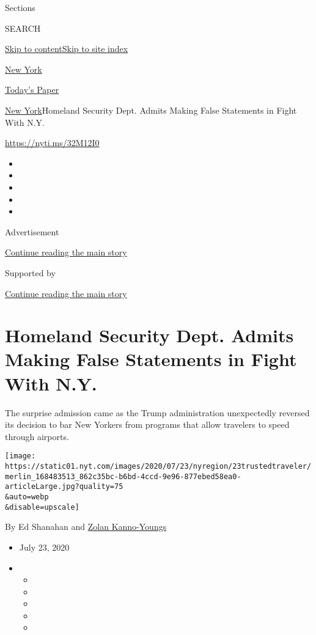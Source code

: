 Sections

SEARCH

\protect\hyperlink{site-content}{Skip to
content}\protect\hyperlink{site-index}{Skip to site index}

\href{https://www.nytimes.com/section/nyregion}{New York}

\href{https://myaccount.nytimes.com/auth/login?response_type=cookie\&client_id=vi}{}

\href{https://www.nytimes.com/section/todayspaper}{Today's Paper}

\href{/section/nyregion}{New York}\textbar{}Homeland Security Dept.
Admits Making False Statements in Fight With N.Y.

\url{https://nyti.ms/32M12I0}

\begin{itemize}
\item
\item
\item
\item
\item
\end{itemize}

Advertisement

\protect\hyperlink{after-top}{Continue reading the main story}

Supported by

\protect\hyperlink{after-sponsor}{Continue reading the main story}

\hypertarget{homeland-security-dept-admits-making-false-statements-in-fight-with-ny}{%
\section{Homeland Security Dept. Admits Making False Statements in Fight
With
N.Y.}\label{homeland-security-dept-admits-making-false-statements-in-fight-with-ny}}

The surprise admission came as the Trump administration unexpectedly
reversed its decision to bar New Yorkers from programs that allow
travelers to speed through airports.

\texttt{[image: https://static01.nyt.com/images/2020/07/23/nyregion/23trustedtraveler/merlin\_168483513\_862c35bc-b6bd-4ccd-9e96-877ebed58ea0-articleLarge.jpg?quality=75\\\&auto=webp\\\&disable=upscale]}

By Ed Shanahan and
\href{https://www.nytimes.com/by/zolan-kanno-youngs}{Zolan Kanno-Youngs}

\begin{itemize}
\item
  July 23, 2020
\item
  \begin{itemize}
  \item
  \item
  \item
  \item
  \item
  \end{itemize}
\end{itemize}

